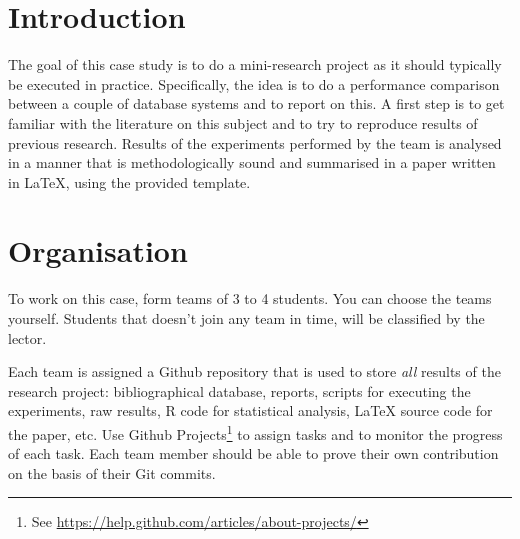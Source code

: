 \documentclass[fleqn,10pt]{artikeltin}
\affiliation{\textbf{Contact:}
    \textsuperscript{1} \href{mailto:wim.goedertier@hogent.be}{wim.goedertier@hogent.be};
    \textsuperscript{2} \href{mailto:jens.buysse@hogent.be}{jens.buysse@hogent.be};
    \textsuperscript{3} \href{mailto:bert.vanvreckem@hogent.be}{bert.vanvreckem@hogent.be};
    \textsuperscript{4} \href{mailto:wim.debruyn@hogent.be}{wim.debruyn@hogent.be}}
\begin{document}
\maketitle %
\tableofcontents %
\thispagestyle{empty} %


\section{Introduction} %
\label{sec:introduction}

The goal of this case study is to do a mini-research project as it should typically be executed in practice. Specifically, the idea is to do a performance comparison between a couple of database systems and to report on this. A first step is to get familiar with the literature on this subject and to try to reproduce results of previous research. Results of the experiments performed by the team is analysed in a manner that is methodologically sound and summarised in a paper written in {\LaTeX}, using the provided template.

\section{Organisation}
\label{sec:organisation}

To work on this case, form teams of 3 to 4 students. You can choose the teams yourself. Students that doesn't join any team in time, will be classified by the lector.

Each team is assigned a Github repository that is used to store \emph{all} results of the research project: bibliographical database, reports, scripts for executing the experiments, raw results, R code for statistical analysis, {\LaTeX} source code for the paper, etc. Use Github Projects\footnote{See \url{https://help.github.com/articles/about-projects/}} to assign tasks and to monitor the progress of each task. Each team member should be able to prove their own contribution on the basis of their Git commits.
\end{document}
